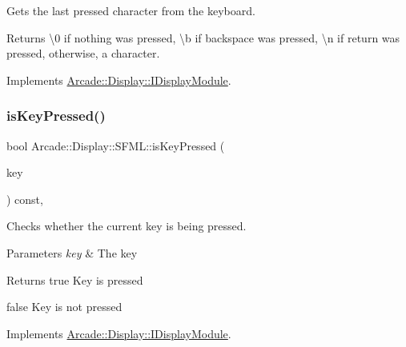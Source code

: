 Gets the last pressed character from the keyboard. 

\begin{DoxyReturn}{Returns}
\textbackslash{}0 if nothing was pressed, \textbackslash{}b if backspace was pressed, \textbackslash{}n if return was pressed, otherwise, a character. 
\end{DoxyReturn}


Implements \mbox{\hyperlink{classArcade_1_1Display_1_1IDisplayModule_a403f8a0f065dad707a881ef3cee79805}{Arcade\+::\+Display\+::\+I\+Display\+Module}}.

\mbox{\label{classArcade_1_1Display_1_1SFML_ad33097d101e94bbb65ea4eed560e03c4}} 
\subsubsection{\texorpdfstring{isKeyPressed()}{isKeyPressed()}}
{\footnotesize\ttfamily bool Arcade\+::\+Display\+::\+S\+F\+M\+L\+::is\+Key\+Pressed (\begin{DoxyParamCaption}\item[{\mbox{\hyperlink{classArcade_1_1Display_1_1IDisplayModule_a8da3f6b309ca0581473ae8cc8789b619}{I\+Display\+Module\+::\+Keys}}}]{key }\end{DoxyParamCaption}) const\hspace{0.3cm}{\ttfamily [final]}, {\ttfamily [virtual]}}



Checks whether the current key is being pressed. 


\begin{DoxyParams}{Parameters}
{\em key} & The key \\
\hline
\end{DoxyParams}
\begin{DoxyReturn}{Returns}
true Key is pressed 

false Key is not pressed 
\end{DoxyReturn}


Implements \mbox{\hyperlink{classArcade_1_1Display_1_1IDisplayModule_af871661ff84c21581cd7233ba6f27aa0}{Arcade\+::\+Display\+::\+I\+Display\+Module}}.

\mbox{\label{classArcade_1_1Display_1_1SFML_a5695d2a080b43f958adf3a63acf5cf78}} 
